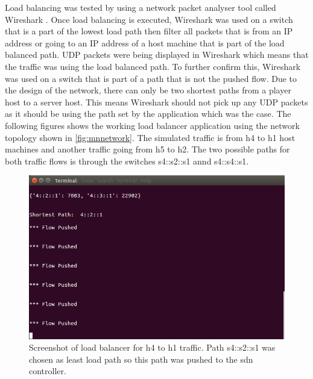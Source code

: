 \newline
\par
Load balancing was tested by using a network packet analyser tool called Wireshark \cite{wireshark}. Once load balancing is executed, Wireshark was used on a switch that is a part of the lowest load path then filter all packets that is from an IP address or going to an IP address of a host machine that is part of the load balanced path. UDP packets were being displayed in Wireshark which means that the traffic was using the load balanced path. To further confirm this, Wireshark was used on a switch that is part of a path that is not the pushed flow. Due to the design of the network, there can only be two shortest paths from a player host to a server host. This means Wireshark should not pick up any UDP packets as it should be using the path set by the application which was the case.
\clearpage
The following figures shows the working load balancer application using the network topology shown in \ref{fig:mnnetwork}. The simulated traffic is from h4 to h1 host machines and another traffic going from h5 to h2. The two possible paths for both traffic flows is through the switches s4::s2::s1 annd s4::s4::s1.
\newline
\begin{figure}[h!]
 \centering
 \includegraphics[width=\linewidth]{images/loadbalancing/h1toh4.png}
 \caption{Screenshot of load balancer for h4 to h1 traffic. Path s4::s2::s1 was chosen as least load path so this path was pushed to the sdn controller.}
 \label{fig:h1toh4}
\end{figure}

